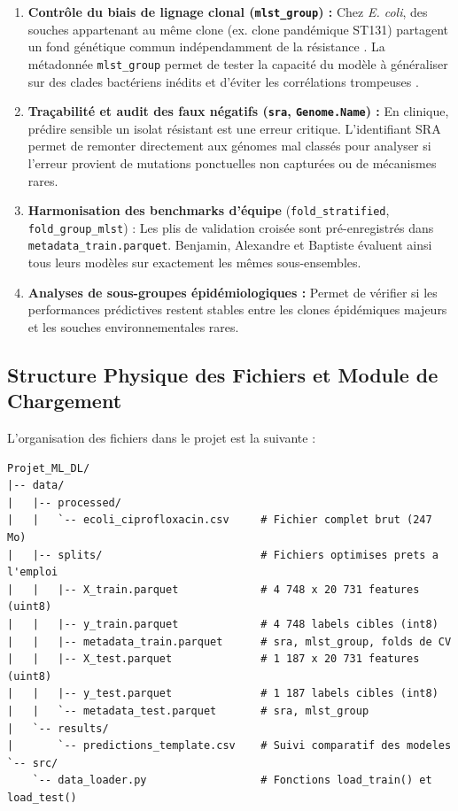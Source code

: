 \documentclass[11pt,a4paper]{article}
\begin{document}
\begin{enumerate}[leftmargin=*]
    \item \textbf{Contrôle du biais de lignage clonal (\texttt{mlst\_group}) :}
    Chez \textit{E. coli}, des souches appartenant au même clone (ex. clone pandémique ST131) partagent un fond génétique commun indépendamment de la résistance \citep{nicolaschanoine2014ecoli}. La métadonnée \texttt{mlst\_group} permet de tester la capacité du modèle à généraliser sur des clades bactériens inédits et d'éviter les corrélations trompeuses \citep{earle2016identifying,lees2016sequence}.
    \item \textbf{Traçabilité et audit des faux négatifs (\texttt{sra}, \texttt{Genome.Name}) :}
    En clinique, prédire sensible un isolat résistant est une erreur critique. L'identifiant SRA \citep{leinonen2011sequence} permet de remonter directement aux génomes mal classés pour analyser si l'erreur provient de mutations ponctuelles non capturées ou de mécanismes rares.
    \item \textbf{Harmonisation des benchmarks d'équipe} (\texttt{fold\_stratified}, \texttt{fold\_group\_mlst}) :
    Les plis de validation croisée sont pré-enregistrés dans \texttt{metadata\_train.parquet}. Benjamin, Alexandre et Baptiste évaluent ainsi tous leurs modèles sur exactement les mêmes sous-ensembles.
    \item \textbf{Analyses de sous-groupes épidémiologiques :}
    Permet de vérifier si les performances prédictives restent stables entre les clones épidémiques majeurs et les souches environnementales rares.
\end{enumerate}

\subsection{Structure Physique des Fichiers et Module de Chargement}

L'organisation des fichiers dans le projet est la suivante :

\begin{verbatim}
Projet_ML_DL/
|-- data/
|   |-- processed/
|   |   `-- ecoli_ciprofloxacin.csv     # Fichier complet brut (247 Mo)
|   |-- splits/                         # Fichiers optimises prets a l'emploi
|   |   |-- X_train.parquet             # 4 748 x 20 731 features (uint8)
|   |   |-- y_train.parquet             # 4 748 labels cibles (int8)
|   |   |-- metadata_train.parquet      # sra, mlst_group, folds de CV
|   |   |-- X_test.parquet              # 1 187 x 20 731 features (uint8)
|   |   |-- y_test.parquet              # 1 187 labels cibles (int8)
|   |   `-- metadata_test.parquet       # sra, mlst_group
|   `-- results/
|       `-- predictions_template.csv    # Suivi comparatif des modeles
`-- src/
    `-- data_loader.py                  # Fonctions load_train() et load_test()
\end{verbatim}
\end{document}
